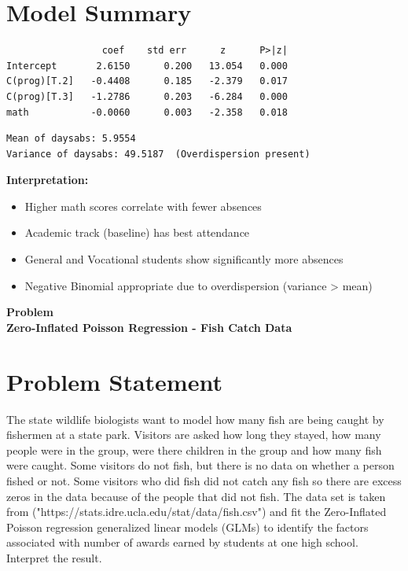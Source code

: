 \documentclass[12pt, a4paper]{article}
\newcounter{problemcounter}
\newcommand{\problemtitle}[1]{%
    \vspace{0.5cm}
    \begin{center}
        \colorbox{DeepGold!20}{\parbox{0.85\textwidth}{\centering
            {\color{RoyalNavy}\Huge\bfseries Problem \arabic{problemcounter}}\\[0.2cm]
            {\color{Charcoal}\large\bfseries #1}
        }}
    \end{center}
    \stepcounter{problemcounter}
    \vspace{0.3cm}
}
\begin{document}
\section*{Model Summary}
\begin{outputbox}
\begin{verbatim}
                 coef    std err      z      P>|z|
Intercept       2.6150      0.200   13.054   0.000
C(prog)[T.2]   -0.4408      0.185   -2.379   0.017
C(prog)[T.3]   -1.2786      0.203   -6.284   0.000
math           -0.0060      0.003   -2.358   0.018
\end{verbatim}
\end{outputbox}

\begin{outputbox}
\begin{verbatim}
Mean of daysabs: 5.9554
Variance of daysabs: 49.5187  (Overdispersion present)
\end{verbatim}
\end{outputbox}

\textbf{\textcolor{RoyalNavy}{Interpretation:}}
\begin{itemize}
    \item Higher math scores correlate with fewer absences
    \item Academic track (baseline) has best attendance
    \item General and Vocational students show significantly more absences
    \item Negative Binomial appropriate due to overdispersion (variance > mean)
\end{itemize}

\newpage

\problemtitle{Zero-Inflated Poisson Regression - Fish Catch Data}
\section{Problem Statement}The state wildlife biologists want to model how many fish are being caught by fishermen at a state park. Visitors are asked how long they stayed, how many people were in the group, were there children in the group and how many fish were caught. Some visitors do not fish, but there is no data on whether a person fished or not. Some visitors who did fish did not catch any fish so there are excess zeros in the data because of the people that did not fish. The data set is taken from ("https://stats.idre.ucla.edu/stat/data/fish.csv") and fit the Zero-Inflated Poisson regression generalized linear models (GLMs) to identify the factors associated with number of awards earned by students at one high school. Interpret the result.
\end{document}

